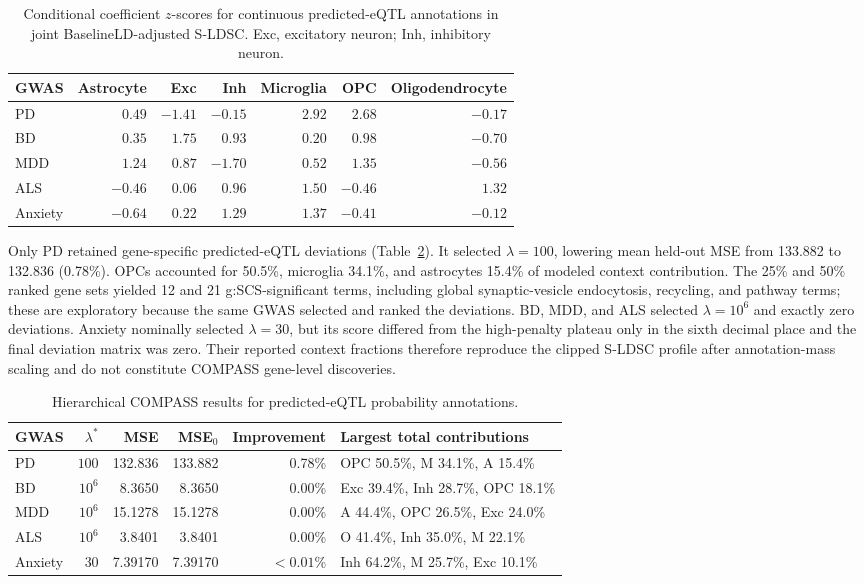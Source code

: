 \documentclass[11pt]{article}
\begin{document}
\begin{table}[ht]
\centering
\scriptsize
\caption{Conditional coefficient $z$-scores for continuous predicted-eQTL annotations in joint BaselineLD-adjusted S-LDSC. Exc, excitatory neuron; Inh, inhibitory neuron.}
\label{tab:eqtl-sldsc}
\begin{tabular}{lrrrrrr}
\toprule
GWAS & Astrocyte & Exc & Inh & Microglia & OPC & Oligodendrocyte \\
\midrule
PD & $0.49$ & $-1.41$ & $-0.15$ & $2.92$ & $2.68$ & $-0.17$ \\
BD & $0.35$ & $1.75$ & $0.93$ & $0.20$ & $0.98$ & $-0.70$ \\
MDD & $1.24$ & $0.87$ & $-1.70$ & $0.52$ & $1.35$ & $-0.56$ \\
ALS & $-0.46$ & $0.06$ & $0.96$ & $1.50$ & $-0.46$ & $1.32$ \\
Anxiety & $-0.64$ & $0.22$ & $1.29$ & $1.37$ & $-0.41$ & $-0.12$ \\
\bottomrule
\end{tabular}
\end{table}

Only PD retained gene-specific predicted-eQTL deviations (Table~\ref{tab:eqtl-compass}). It selected $\lambda=100$, lowering mean held-out MSE from 133.882 to 132.836 (0.78\%). OPCs accounted for 50.5\%, microglia 34.1\%, and astrocytes 15.4\% of modeled context contribution. The 25\% and 50\% ranked gene sets yielded 12 and 21 g:SCS-significant terms, including global synaptic-vesicle endocytosis, recycling, and pathway terms; these are exploratory because the same GWAS selected and ranked the deviations. BD, MDD, and ALS selected $\lambda=10^6$ and exactly zero deviations. Anxiety nominally selected $\lambda=30$, but its score differed from the high-penalty plateau only in the sixth decimal place and the final deviation matrix was zero. Their reported context fractions therefore reproduce the clipped S-LDSC profile after annotation-mass scaling and do not constitute COMPASS gene-level discoveries.

\begin{table}[ht]
\centering
\small
\caption{Hierarchical COMPASS results for predicted-eQTL probability annotations.}
\label{tab:eqtl-compass}
\begin{tabular}{lrrrrl}
\toprule
GWAS & $\lambda^*$ & MSE & MSE$_0$ & Improvement & Largest total contributions \\
\midrule
PD & $100$ & 132.836 & 133.882 & 0.78\% & OPC 50.5\%, M 34.1\%, A 15.4\% \\
BD & $10^6$ & 8.3650 & 8.3650 & 0.00\% & Exc 39.4\%, Inh 28.7\%, OPC 18.1\% \\
MDD & $10^6$ & 15.1278 & 15.1278 & 0.00\% & A 44.4\%, OPC 26.5\%, Exc 24.0\% \\
ALS & $10^6$ & 3.8401 & 3.8401 & 0.00\% & O 41.4\%, Inh 35.0\%, M 22.1\% \\
Anxiety & $30$ & 7.39170 & 7.39170 & $<0.01$\% & Inh 64.2\%, M 25.7\%, Exc 10.1\% \\
\bottomrule
\end{tabular}
\end{table}
\end{document}
